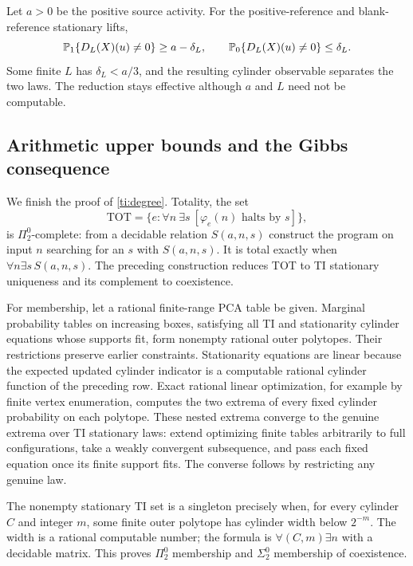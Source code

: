 Let $a>0$ be the positive source activity. For the positive-reference and blank-reference stationary lifts,
\[
 \mathbb{P}_1\{D_L(X)(u)\ne0\}\ge a-\delta_L,\qquad
 \mathbb{P}_0\{D_L(X)(u)\ne0\}\le\delta_L.
\]
Some finite $L$ has $\delta_L<a/3$, and the resulting cylinder observable separates the two laws. The reduction stays effective although $a$ and $L$ need not be computable.

\subsection{Arithmetic upper bounds and the Gibbs consequence}

We finish the proof of \cref{ti:degree}. Totality, the set
\[
 \mathrm{TOT}=\{e:\forall n\ \exists s\ [\varphi_e(n)\text{ halts by }s]\},
\]
is $\Pi^0_2$-complete: from a decidable relation $S(a,n,s)$ construct the program on input $n$ searching for an $s$ with $S(a,n,s)$. It is total exactly when $\forall n\exists s\,S(a,n,s)$. The preceding construction reduces TOT to TI stationary uniqueness and its complement to coexistence.

For membership, let a rational finite-range PCA table be given. Marginal probability tables on increasing boxes, satisfying all TI and stationarity cylinder equations whose supports fit, form nonempty rational outer polytopes. Their restrictions preserve earlier constraints. Stationarity equations are linear because the expected updated cylinder indicator is a computable rational cylinder function of the preceding row. Exact rational linear optimization, for example by finite vertex enumeration, computes the two extrema of every fixed cylinder probability on each polytope. These nested extrema converge to the genuine extrema over TI stationary laws: extend optimizing finite tables arbitrarily to full configurations, take a weakly convergent subsequence, and pass each fixed equation once its finite support fits. The converse follows by restricting any genuine law.

The nonempty stationary TI set is a singleton precisely when, for every cylinder $C$ and integer $m$, some finite outer polytope has cylinder width below $2^{-m}$. The width is a rational computable number; the formula is $\forall(C,m)\exists n$ with a decidable matrix. This proves $\Pi^0_2$ membership and $\Sigma^0_2$ membership of coexistence.


